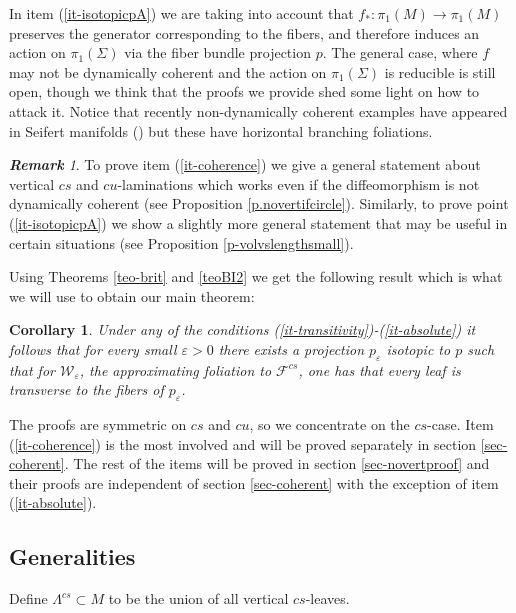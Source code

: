 \documentclass[11pt]{amsart} %
\newcommand{\cW}{\mathcal{W}}
\newcommand{\Fcs}{\mathcal{F}^{cs}}
\newcommand{\eps}{\varepsilon}
\numberwithin{equation}{section}
\newtheorem{cor}[equation]{Corollary}
\theoremstyle{remark}
\newtheorem*{remark} {\textbf{Remark}}
\begin{document}
In item (\ref{it-isotopicpA}) we are taking into account that $f_\ast : \pi_1(M) \to \pi_1(M)$ preserves the generator corresponding to the fibers, and therefore induces an action on $\pi_1(\Sigma)$ via the fiber bundle projection $p$.  
The general case, where $f$ may not be dynamically coherent and the action on $\pi_1(\Sigma)$ is reducible is still open, though we think that the proofs we provide shed some light on how to attack it.  Notice that recently non-dynamically coherent examples have appeared in Seifert manifolds (\cite{BGHP}) but these have horizontal branching foliations. %

%
%
%
\medskip

\begin{remark} To prove item (\ref{it-coherence}) we give a general statement about vertical $cs$ and $cu$-laminations which works even if the diffeomorphism is not dynamically coherent (see Proposition \ref{p.novertifcircle}).  Similarly, to prove point (\ref{it-isotopicpA}) we show a slightly more general statement that may be useful in certain situations (see Proposition \ref{p-volvslengthsmall}).
\end{remark}

Using Theorems \ref{teo-brit} and \ref{teoBI2} we get the following result which is what we will use to obtain our main theorem:

\begin{cor}\label{cor-novert} Under any of the conditions (\ref{it-transitivity})-(\ref{it-absolute}) it follows that for every small $\eps>0$ there exists a projection $p_\eps$ isotopic to $p$ such that for $\cW_\eps$, the approximating foliation to $\Fcs$, one has that every leaf is transverse to the fibers of $p_\eps$. 
\end{cor}

The proofs are symmetric on $cs$ and $cu$, so we concentrate on the $cs$-case. Item (\ref{it-coherence}) is the most involved and will be proved separately in section \ref{sec-coherent}. The rest of the items will be proved in section \ref{sec-novertproof} and their proofs are independent of section \ref{sec-coherent} with the exception of item (\ref{it-absolute}). 

\subsection{Generalities} 
Define $\Lambda^{cs} \subset M$ to be the union of all vertical $cs$-leaves. 
\end{document}
